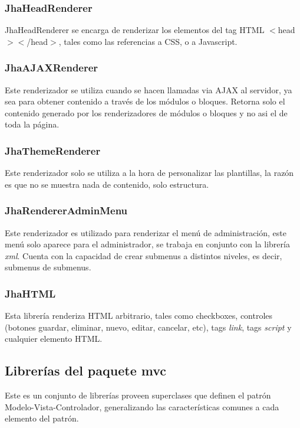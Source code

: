 \subsubsection{JhaHeadRenderer}
JhaHeadRenderer se encarga de renderizar los elementos del tag HTML $<$head$><$/head$>$, tales como las referencias a CSS, o a Javascript.

\subsubsection{JhaAJAXRenderer}
Este renderizador se utiliza cuando se hacen llamadas via AJAX al servidor, ya sea para obtener contenido a trav\'es de los m\'odulos o bloques. Retorna solo el contenido generado por los renderizadores de m\'odulos o bloques y no asi el de toda la p\'agina.

\subsubsection{JhaThemeRenderer}
Este renderizador solo se utiliza a la hora de personalizar las plantillas, la raz\'on es que no se muestra nada de contenido, solo estructura.

\subsubsection{JhaRendererAdminMenu}
Este renderizador es utilizado para renderizar el men\'u de administraci\'on, este men\'u solo aparece para el administrador, se trabaja en conjunto con la librer\'ia \textit{xml}. Cuenta con la capacidad de crear submenus a distintos niveles, es decir, submenus de submenus.

\subsubsection{JhaHTML}
Esta librer\'ia renderiza HTML arbitrario, tales como checkboxes, controles (botones guardar, eliminar, nuevo, editar, cancelar, etc), tags \textit{link}, tags \textit{script} y cualquier elemento HTML.

\subsection{Librer\'ias del paquete \textsf{mvc}}
Este es un conjunto de librer\'ias proveen superclases que definen el patr\'on Modelo-Vista-Controlador, generalizando las caracter\'isticas comunes a cada elemento del patr\'on.


